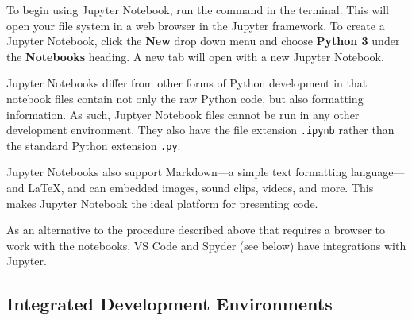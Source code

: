 To begin using Jupyter Notebook, run the command  in the terminal.
This will open your file system in a web browser in the Jupyter framework.
To create a Jupyter Notebook, click the \textbf{New} drop down menu and choose \textbf{Python 3} under the \textbf{Notebooks} heading.
A new tab will open with a new Jupyter Notebook.

Jupyter Notebooks differ from other forms of Python development in that notebook files contain not only the raw Python code, but also formatting information.
As such, Juptyer Notebook files cannot be run in any other development environment.
They also have the file extension \texttt{.ipynb} rather than the standard Python extension \texttt{.py}.

Jupyter Notebooks also support Markdown---a simple text formatting
language---and \LaTeX, and can embedded images, sound clips, videos, and
more.  This makes Jupyter Notebook the ideal platform for presenting
code.

As an alternative to the procedure described above that requires a
browser to work with the notebooks, VS Code and Spyder (see below) have
integrations with Jupyter.



\subsection*{Integrated Development Environments} %

